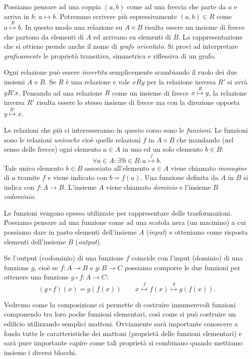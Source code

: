 \documentclass[italian,a4paper,hidelinks,headinclude]{scrartcl}
\newcommand{\myemph}[1]{\emph{#1}\marginpar{#1}}
\begin{document}
Possiamo pensare ad una coppia $(a,b)$ come ad una freccia che
parte da $a$ e arriva in $b$: $a \mapsto b$.
Potremmo scrivere più espressivamente $(a,b)\in R$ come
$a \stackrel{R}\mapsto b$.
In questo modo una relazione su $A\times B$
risulta essere un insieme di frecce che partono da elementi di $A$
ed arrivano su elementi di $B$. La rappresentazione che si ottiene prende
anche il nome di \emph{grafo orientato}.
Si provi ad interpretare \emph{graficamente} le proprietà
transitiva, simmetrica e riflessiva di un grafo.

Ogni relazione può essere \emph{invertita}
semplicemente scambiando il ruolo
dei due insiemi $A$ e $B$. Se $R$ è una relazione e vale $x R y$
per la relazione inversa $R'$ si avrà
$y R' x$.
Pensando ad una relazione $R$ come un insieme di frecce
$x\stackrel R \mapsto y$,
la relazione inversa $R'$ risulta essere lo stesso insieme di frecce ma
con la direzione opposta $y\stackrel{R'} \mapsto x$.

Le relazioni che più ci interesseranno in questo corso sono le \myemph{funzioni}.
Le funzioni sono le relazioni \emph{univoche} cioè quelle relazioni $f$ in
$A\times B$ che
mandando (nel senso delle frecce) ogni elemento $a\in A$ in uno
ed un solo elemento
$b\in B$:
\[
\forall a\in A\colon \exists ! b\in B\colon a\stackrel{f}\mapsto b.
\]
Tale unico elemento $b\in B$ associato all'elemento $a\in A$ viene chiamato
\emph{immagine} di $a$ tramite $f$ e viene indicato con $b=f(a)$.
Una funzione definita da $A$ in $B$ si indica con $f\colon A \to B$. L'insieme
$A$ viene chiamato \myemph{dominio} e l'insieme $B$ \myemph{codominio}.

Le funzioni vengono spesso utilizzate per rappresentare delle trasformazioni.
Possiamo pensare ad una funzione come ad una scatola nera (un macinino)
a cui possiamo dare in pasto elementi dell'insieme $A$ (\emph{input})
e otteniamo come risposta elementi dell'insieme $B$ (\emph{output}).

Se l'output (codominio) di una funzione $f$
coincide con l'input (dominio) di una funzione $g$,
cioè se $f\colon A \to B$ e $g\colon B \to C$
possiamo comporre
le due funzioni per ottenere una funzione
$g\circ f \colon A \to C$:
\[
(g\circ f)(x) = g(f(x))\qquad
x \stackrel f \mapsto f(x) \stackrel g \mapsto g(f(x)).
\]

Vedremo come la composizione ci permette di costruire innumerevoli funzioni
componendo tra loro poche funzioni elementari, così come si può costruire un edificio
utilizzando semplici mattoni.
Ovviamente sarà importante conoscere a fondo
tutte le caratteristiche dei mattoni (proprietà delle funzioni elementari)
e sarà pure importante capire come tali proprietà si combinano quando mettiamo
insieme i diversi blocchi.
\end{document}
